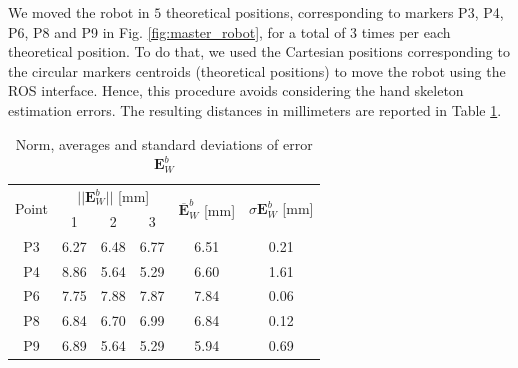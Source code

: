 \documentclass[a4paper, 10 pt, conference]{ieeeconf}      %
\begin{document}
We moved the robot in $5$ theoretical positions, corresponding to markers P3, P4, P6, P8 and P9 in Fig. \ref{fig:master_robot}, for a total of $3$ times per each theoretical position. To do that, we used the Cartesian positions corresponding to the circular markers centroids (theoretical positions) to move the robot using the ROS interface. Hence, this procedure avoids considering the hand skeleton estimation errors.
The resulting distances in millimeters are reported in Table \ref{tab:laser}.

\begin{table}[h!]
	\centering
	\caption{Norm, averages and standard deviations of error $\mathbf{E}^b_{W}$}
	\label{tab:laser}
	\begin{adjustbox}{max width=\textwidth}
		\begin{tabular}{@{}cccccc@{}}
			\toprule
			\multirow{2}{*}{Point} & \multicolumn{3}{c}{$||\mathbf{E}^b_{W}||$ {[}mm{]}} & \multicolumn{1}{l}{\multirow{2}{*}{$\overline{\mathbf{E}}^b_{W}$ {[}mm{]}}} & \multicolumn{1}{l}{\multirow{2}{*}{$\sigma\mathbf{E}^b_{W}$ {[}mm{]}}} \\ \cmidrule(lr){2-4}
			& 1         & 2         & 3         & \multicolumn{1}{l}{}                                  & \multicolumn{1}{l}{}                                   \\ \midrule
			P3                      & 6.27      & 6.48      & 6.77      & 6.51                                                  & 0.21                                                   \\
			P4                      & 8.86      & 5.64      & 5.29      & 6.60                                                  & 1.61                                                   \\
			P6                      & 7.75      & 7.88      & 7.87      & 7.84                                                  & 0.06                                                   \\
			P8                      & 6.84      & 6.70      & 6.99      & 6.84                                                  & 0.12                                                   \\
			P9                     & 6.89      & 5.64      & 5.29      & 5.94                                                  & 0.69                                                   \\ \bottomrule
		\end{tabular}%
	\end{adjustbox}
\end{table}
\end{document}
